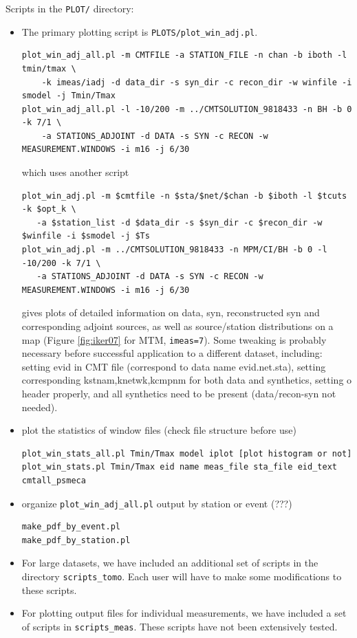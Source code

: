 \documentclass[11pt,titlepage,fleqn]{article}
\begin{document}
Scripts in the \verb+PLOT/+ directory:
%
\begin{itemize}
\item The primary plotting script is \verb+PLOTS/plot_win_adj.pl+.
\begin{verbatim}
plot_win_adj_all.pl -m CMTFILE -a STATION_FILE -n chan -b iboth -l tmin/tmax \
    -k imeas/iadj -d data_dir -s syn_dir -c recon_dir -w winfile -i smodel -j Tmin/Tmax
plot_win_adj_all.pl -l -10/200 -m ../CMTSOLUTION_9818433 -n BH -b 0 -k 7/1 \
    -a STATIONS_ADJOINT -d DATA -s SYN -c RECON -w MEASUREMENT.WINDOWS -i m16 -j 6/30
\end{verbatim}
which uses another script
\begin{verbatim}
plot_win_adj.pl -m $cmtfile -n $sta/$net/$chan -b $iboth -l $tcuts -k $opt_k \
   -a $station_list -d $data_dir -s $syn_dir -c $recon_dir -w $winfile -i $smodel -j $Ts
plot_win_adj.pl -m ../CMTSOLUTION_9818433 -n MPM/CI/BH -b 0 -l -10/200 -k 7/1 \
   -a STATIONS_ADJOINT -d DATA -s SYN -c RECON -w MEASUREMENT.WINDOWS -i m16 -j 6/30
\end{verbatim}
gives plots of detailed information on data, syn, reconstructed syn and corresponding adjoint sources, as well as
source/station distributions on a map (Figure \ref{fig:iker07} for MTM, \verb+imeas=7+).
Some tweaking is probably necessary before successful application to a different dataset, including: setting
evid in CMT file (correspond to data name evid.net.sta), setting corresponding kstnam,knetwk,kcmpnm for both
data and synthetics, setting o header properly, and all synthetics need to be present (data/recon-syn not needed).


\item  plot the statistics of window files (check file structure before use)
\begin{verbatim}
plot_win_stats_all.pl Tmin/Tmax model iplot [plot histogram or not]
plot_win_stats.pl Tmin/Tmax eid name meas_file sta_file eid_text cmtall_psmeca
\end{verbatim}

\item organize \verb+plot_win_adj_all.pl+ output by station or event (???)
\begin{verbatim}
make_pdf_by_event.pl
make_pdf_by_station.pl
\end{verbatim}

\item For large datasets, we have included an additional set of scripts in the directory \verb+scripts_tomo+. Each user will have to make some modifications to these scripts.

\item For plotting output files for individual measurements, we have included a set of scripts in \verb+scripts_meas+.  These scripts have not been extensively tested.
\end{itemize}
\end{document}
